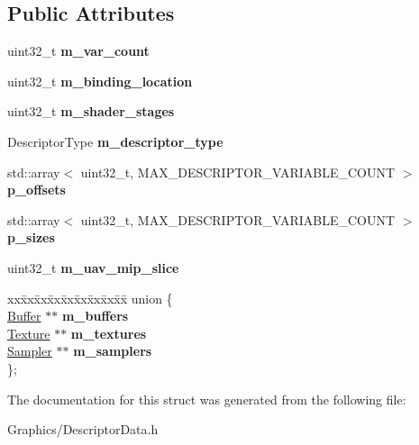 \subsection*{Public Attributes}
\begin{DoxyCompactItemize}
\item 
\mbox{\label{structDescriptorData_a174833a0ae32827f8a4e5ba1f01516d8}} 
uint32\+\_\+t {\bfseries m\+\_\+var\+\_\+count}
\item 
\mbox{\label{structDescriptorData_acc1977530e41127569b175af155eea7e}} 
uint32\+\_\+t {\bfseries m\+\_\+binding\+\_\+location}
\item 
\mbox{\label{structDescriptorData_a762b44303b179700554a9fb66a3b1fdd}} 
uint32\+\_\+t {\bfseries m\+\_\+shader\+\_\+stages}
\item 
\mbox{\label{structDescriptorData_a58819f33f89d39a357274098650090d6}} 
Descriptor\+Type {\bfseries m\+\_\+descriptor\+\_\+type}
\item 
\mbox{\label{structDescriptorData_aac75035b5bc3ab79c6affb65e247071f}} 
std\+::array$<$ uint32\+\_\+t, M\+A\+X\+\_\+\+D\+E\+S\+C\+R\+I\+P\+T\+O\+R\+\_\+\+V\+A\+R\+I\+A\+B\+L\+E\+\_\+\+C\+O\+U\+NT $>$ {\bfseries p\+\_\+offsets}
\item 
\mbox{\label{structDescriptorData_aa201349c0c226a2ab8d7327becc04a3a}} 
std\+::array$<$ uint32\+\_\+t, M\+A\+X\+\_\+\+D\+E\+S\+C\+R\+I\+P\+T\+O\+R\+\_\+\+V\+A\+R\+I\+A\+B\+L\+E\+\_\+\+C\+O\+U\+NT $>$ {\bfseries p\+\_\+sizes}
\item 
\mbox{\label{structDescriptorData_a8de8b3c487bd09200b816e63b6c7ea92}} 
uint32\+\_\+t {\bfseries m\+\_\+uav\+\_\+mip\+\_\+slice}
\item 
\mbox{\label{structDescriptorData_a5289b918a0ddcd3255c9f482963993cf}} 
\begin{tabbing}
xx\=xx\=xx\=xx\=xx\=xx\=xx\=xx\=xx\=\kill
union \{\\
\>\hyperlink{classBuffer}{Buffer} $\ast$$\ast$ {\bfseries m\_buffers}\\
\>\hyperlink{classTexture}{Texture} $\ast$$\ast$ {\bfseries m\_textures}\\
\>\hyperlink{classSampler}{Sampler} $\ast$$\ast$ {\bfseries m\_samplers}\\
\}; \\

\end{tabbing}\end{DoxyCompactItemize}


The documentation for this struct was generated from the following file\+:\begin{DoxyCompactItemize}
\item 
Graphics/Descriptor\+Data.\+h\end{DoxyCompactItemize}
